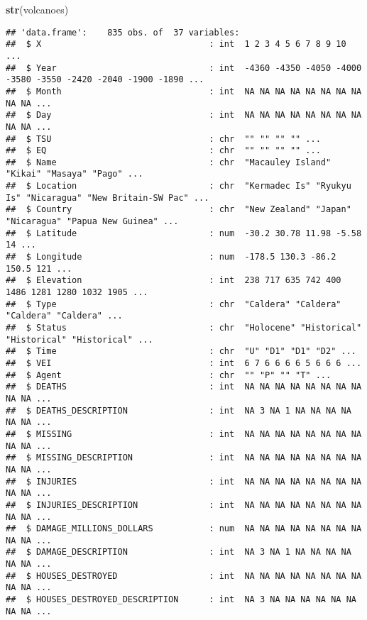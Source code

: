 \documentclass[
]{article}
\newenvironment{Shaded}{\begin{snugshade}}{\end{snugshade}}
\newcommand{\KeywordTok}[1]{\textcolor[rgb]{0.13,0.29,0.53}{\textbf{#1}}}
\newcommand{\NormalTok}[1]{#1}
\begin{document}
\begin{Shaded}
\begin{Highlighting}[]
\KeywordTok{str}\NormalTok{(volcanoes)}
\end{Highlighting}
\end{Shaded}

\begin{verbatim}
## 'data.frame':    835 obs. of  37 variables:
##  $ X                                 : int  1 2 3 4 5 6 7 8 9 10 ...
##  $ Year                              : int  -4360 -4350 -4050 -4000 -3580 -3550 -2420 -2040 -1900 -1890 ...
##  $ Month                             : int  NA NA NA NA NA NA NA NA NA NA ...
##  $ Day                               : int  NA NA NA NA NA NA NA NA NA NA ...
##  $ TSU                               : chr  "" "" "" "" ...
##  $ EQ                                : chr  "" "" "" "" ...
##  $ Name                              : chr  "Macauley Island" "Kikai" "Masaya" "Pago" ...
##  $ Location                          : chr  "Kermadec Is" "Ryukyu Is" "Nicaragua" "New Britain-SW Pac" ...
##  $ Country                           : chr  "New Zealand" "Japan" "Nicaragua" "Papua New Guinea" ...
##  $ Latitude                          : num  -30.2 30.78 11.98 -5.58 14 ...
##  $ Longitude                         : num  -178.5 130.3 -86.2 150.5 121 ...
##  $ Elevation                         : int  238 717 635 742 400 1486 1281 1280 1032 1905 ...
##  $ Type                              : chr  "Caldera" "Caldera" "Caldera" "Caldera" ...
##  $ Status                            : chr  "Holocene" "Historical" "Historical" "Historical" ...
##  $ Time                              : chr  "U" "D1" "D1" "D2" ...
##  $ VEI                               : int  6 7 6 6 6 6 5 6 6 6 ...
##  $ Agent                             : chr  "" "P" "" "T" ...
##  $ DEATHS                            : int  NA NA NA NA NA NA NA NA NA NA ...
##  $ DEATHS_DESCRIPTION                : int  NA 3 NA 1 NA NA NA NA NA NA ...
##  $ MISSING                           : int  NA NA NA NA NA NA NA NA NA NA ...
##  $ MISSING_DESCRIPTION               : int  NA NA NA NA NA NA NA NA NA NA ...
##  $ INJURIES                          : int  NA NA NA NA NA NA NA NA NA NA ...
##  $ INJURIES_DESCRIPTION              : int  NA NA NA NA NA NA NA NA NA NA ...
##  $ DAMAGE_MILLIONS_DOLLARS           : num  NA NA NA NA NA NA NA NA NA NA ...
##  $ DAMAGE_DESCRIPTION                : int  NA 3 NA 1 NA NA NA NA NA NA ...
##  $ HOUSES_DESTROYED                  : int  NA NA NA NA NA NA NA NA NA NA ...
##  $ HOUSES_DESTROYED_DESCRIPTION      : int  NA 3 NA NA NA NA NA NA NA NA ...

\end{verbatim}
\end{document}
